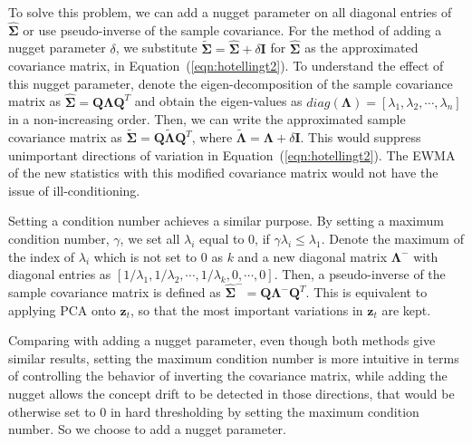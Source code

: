 \documentclass[twoside,11pt]{article}
\begin{document}
To solve this problem, we can add a nugget parameter on all diagonal entries of $\hat {\bm { \Sigma}}$ or use pseudo-inverse of the sample covariance. For the method of adding a nugget parameter $ \delta$, we substitute $\tilde {\bm { \Sigma}} = \hat {\bm { \Sigma}}+ \delta \bm {I}$ for $\hat {\bm { \Sigma}}$ as the approximated covariance matrix, in Equation~(\ref{eqn:hotellingt2}). To understand the effect of this nugget parameter, denote the eigen-decomposition of the sample covariance matrix as $\hat {\bm { \Sigma}} = \bm {Q}\bm { \Lambda} \bm {Q}^T$ and obtain the eigen-values as $ diag(\bm{\Lambda}) = [ \lambda_1, \lambda_2,\cdots, \lambda_n]$ in a non-increasing order. Then, we can write the approximated sample covariance matrix as $\tilde {\bm { \Sigma}} = \bm {Q}\tilde{\bm { \Lambda}} \bm {Q}^T$, where $\tilde{\bm { \Lambda}} = \bm { \Lambda} + \delta \bm {I}$. This would suppress unimportant directions of variation in Equation~(\ref{eqn:hotellingt2}). The EWMA of the new statistics with this modified covariance matrix would not have the issue of ill-conditioning. 

Setting a condition number achieves a similar purpose. By setting a maximum condition number, $ \gamma$, we set all $ \lambda_i$ equal to $0$, if $ \gamma \lambda_i \leq \lambda_1$. Denote the maximum of the index of $ \lambda_i$ which is not set to $0$ as $k$ and a new diagonal matrix $\bm { \Lambda} ^{-}$ with diagonal entries as $[1/\lambda_1,1/\lambda_2, \cdots, 1/\lambda_k, 0, \cdots, 0]$. Then, a pseudo-inverse of the sample covariance matrix is defined as $\hat {\bm { \Sigma}} ^{-} = \bm {Q}\bm { \Lambda}^{-}\bm {Q}^T$. This is equivalent to applying PCA onto $\bm {z}_t$, so that the most important variations in $\bm {z}_t$ are kept. 

Comparing with adding a nugget parameter, even though both methods give similar results, setting the maximum condition number is more intuitive in terms of controlling the behavior of inverting the covariance matrix, while adding the nugget allows the concept drift to be detected in those directions, that would be otherwise set to $0$ in hard thresholding by setting the maximum condition number. So we choose to add a nugget parameter.
\end{document}
